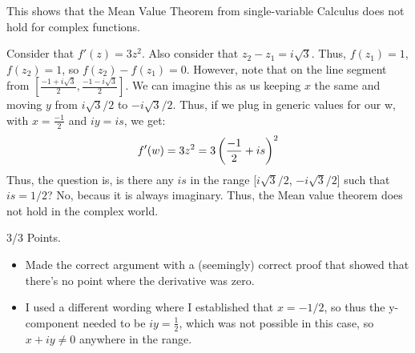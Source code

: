 \begin{enumerate}
    This shows that the Mean Value Theorem from single-variable Calculus does not hold for complex functions.
	\begin{problem}
		Consider that $f'(z) = 3z^2$. Also consider that $z_2 -z_1=i\sqrt3$. Thus, $f(z_1) = 1$, $f(z_2) = 1$, so $f(z_2) - f(z_1)=0$.\gline{}
		However, note that on the line segment from $\left[\frac{-1+i\sqrt3}2,\frac{-1-i\sqrt3}2\right]$. We can imagine this as us keeping $x$ the same and moving $y$ from $i\sqrt3 /2$ to $-i\sqrt3 /2$.\gline{}
		Thus, if we plug in generic values for our w, with $x = \frac{-1}2$ and $iy = is$, we get:
		\begin{align*}
			f'(w)= 3z^2 = 3\left(\frac{-1}2 + is\right)^2
		\end{align*} 
		Thus, the question is, is there any $is$ in the range [$i\sqrt3 /2$, $-i\sqrt3 /2$] such that $is = 1/2$? No, becaus it is always imaginary.\gline{}
		Thus, the Mean value theorem does not hold in the complex world. 
	\end{problem}
	\begin{grade}
		3/3 Points.
		\begin{itemize}[parsep=0pt, itemsep=0pt]
			\item Made the correct argument with a (seemingly) correct proof that showed that there's no point where the derivative was zero.
			\item I used a different wording where I established that $x = -1/2$, so thus the y-component needed to be $iy = \frac{1}2$, which was not possible in this case, so $x + iy \ne 0$ anywhere in the range. 
		\end{itemize}
	\end{grade}
\end{enumerate}





